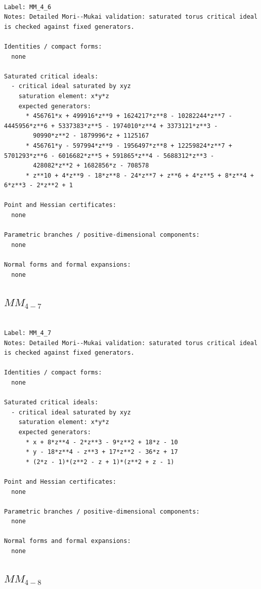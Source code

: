 \documentclass[10pt,a4paper]{article}
\begin{document}
\begin{lstlisting}

Label: MM_4_6
Notes: Detailed Mori--Mukai validation: saturated torus critical ideal is checked against fixed generators.

Identities / compact forms:
  none

Saturated critical ideals:
  - critical ideal saturated by xyz
    saturation element: x*y*z
    expected generators:
      * 456761*x + 499916*z**9 + 1624217*z**8 - 10282244*z**7 - 4445956*z**6 + 5337383*z**5 - 1974010*z**4 + 3373121*z**3 -
        90990*z**2 - 1879996*z + 1125167
      * 456761*y - 597994*z**9 - 1956497*z**8 + 12259824*z**7 + 5701293*z**6 - 6016682*z**5 + 591865*z**4 - 5688312*z**3 -
        428082*z**2 + 1682856*z - 708578
      * z**10 + 4*z**9 - 18*z**8 - 24*z**7 + z**6 + 4*z**5 + 8*z**4 + 6*z**3 - 2*z**2 + 1

Point and Hessian certificates:
  none

Parametric branches / positive-dimensional components:
  none

Normal forms and formal expansions:
  none

\end{lstlisting}

\subsection*{$ MM_{4-7} $}

\begin{lstlisting}

Label: MM_4_7
Notes: Detailed Mori--Mukai validation: saturated torus critical ideal is checked against fixed generators.

Identities / compact forms:
  none

Saturated critical ideals:
  - critical ideal saturated by xyz
    saturation element: x*y*z
    expected generators:
      * x + 8*z**4 - 2*z**3 - 9*z**2 + 18*z - 10
      * y - 18*z**4 - z**3 + 17*z**2 - 36*z + 17
      * (2*z - 1)*(z**2 - z + 1)*(z**2 + z - 1)

Point and Hessian certificates:
  none

Parametric branches / positive-dimensional components:
  none

Normal forms and formal expansions:
  none

\end{lstlisting}

\subsection*{$ MM_{4-8} $}
\end{document}

